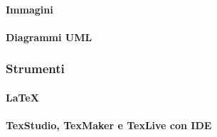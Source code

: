 			\paragraph{Immagini}
			\paragraph{Diagrammi UML}			

		\subsubsection{Strumenti}
			\paragraph{LaTeX}
			\paragraph{TexStudio, TexMaker e TexLive con IDE}		